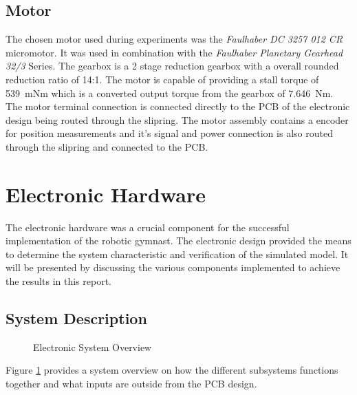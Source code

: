 \subsection{Motor}
The chosen motor used during experiments was the \textit{Faulhaber DC 3257 012 CR} micromotor. It was used in combination with the \textit{Faulhaber Planetary Gearhead 32/3} Series. The gearbox is a 2 stage reduction gearbox with a overall rounded reduction ratio of 14:1. The motor is capable of providing a stall torque of \SI{539}{mNm} which is a converted output torque from the gearbox of \SI{7.646}{Nm}.\\

The motor terminal connection is connected directly to the PCB of the electronic design being routed through the slipring. The motor assembly contains a encoder for position measurements and it's signal and power connection is also routed through the slipring and connected to the PCB.\\

\section{Electronic Hardware}
\label{sec:electronic_hardware}
The electronic hardware was a crucial component for the successful implementation of the robotic gymnast. The electronic design provided the means to determine the system characteristic and verification of the simulated model. It will be presented by discussing the various components implemented to achieve the results in this report.

\subsection{System Description}

\begin{figure}[h]
	\centering
	
	\caption{Electronic System Overview}
	\label{fig:electronicSystemOverview}
\end{figure}



Figure \ref{fig:electronicSystemOverview} provides a system overview on how the different subsystems functions together and what inputs are outside from the PCB design.\\

